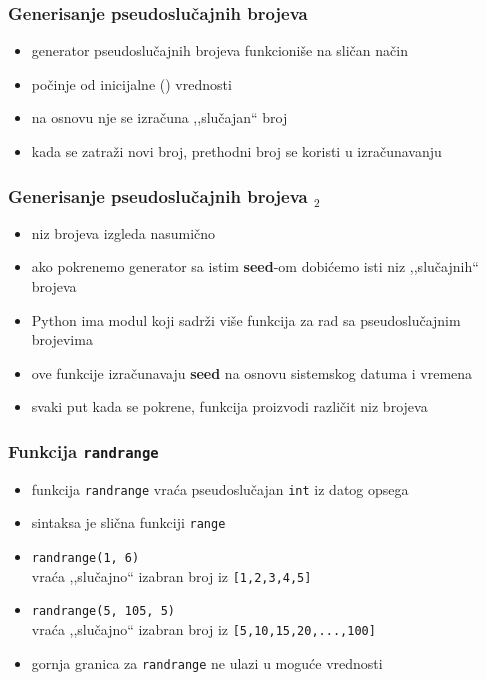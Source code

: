 \documentclass[utf8,compress]{beamer}
\begin{document}
\begin{frame}
  \frametitle{Generisanje pseudoslučajnih brojeva}
  \begin{itemize}
    \item generator pseudoslučajnih brojeva funkcioniše na sličan način
    \item počinje od inicijalne () vrednosti
    \item na osnovu nje se izračuna ,,slučajan`` broj
    \item kada se zatraži novi broj, prethodni broj se koristi u izračunavanju
  \end{itemize}
\end{frame}

\begin{frame}
  \frametitle{Generisanje pseudoslučajnih brojeva $_2$}
  \begin{itemize}
    \item niz brojeva izgleda nasumično
    \item ako pokrenemo generator sa istim \textbf{seed}-om dobićemo isti niz ,,slučajnih`` brojeva
    \item Python ima modul koji sadrži više funkcija za rad sa pseudoslučajnim brojevima
    \item ove funkcije izračunavaju \textbf{seed} na osnovu sistemskog datuma i vremena
    \item svaki put kada se pokrene, funkcija proizvodi različit niz brojeva
  \end{itemize}
\end{frame}

\begin{frame}
  \frametitle{Funkcija \texttt{randrange}}
  \begin{itemize}
    \item funkcija \texttt{randrange} vraća pseudoslučajan \texttt{int} iz datog opsega
    \item sintaksa je slična funkciji \texttt{range}
    \item \texttt{randrange(1, 6)} \\
      vraća ,,slučajno`` izabran broj iz \texttt{[1,2,3,4,5]}
    \item \texttt{randrange(5, 105, 5)} \\
      vraća ,,slučajno`` izabran broj iz \texttt{[5,10,15,20,...,100]}
    \item gornja granica za \texttt{randrange} ne ulazi u moguće vrednosti
  \end{itemize}
\end{frame}
\end{document}

